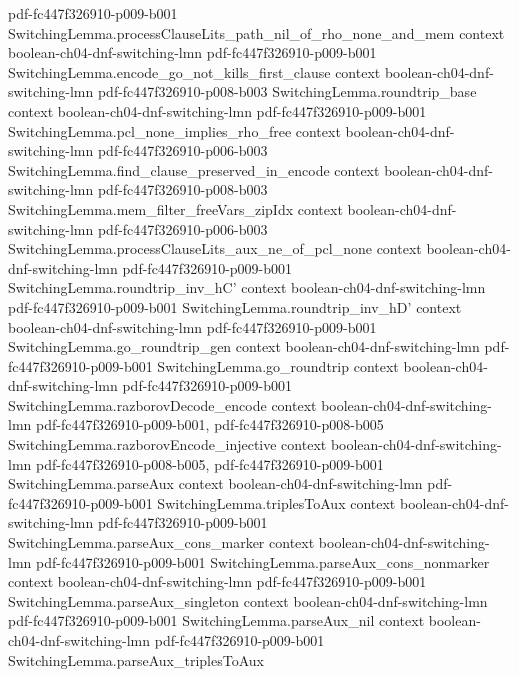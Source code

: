 \begin{theorem}
  {pdf-fc447f326910-p009-b001}
\proofstep
  {SwitchingLemma.processClauseLits_path_nil_of_rho_none_and_mem}
  {context}
  {boolean-ch04-dnf-switching-lmn}
  {pdf-fc447f326910-p009-b001}
\proofstep
  {SwitchingLemma.encode_go_not_kills_first_clause}
  {context}
  {boolean-ch04-dnf-switching-lmn}
  {pdf-fc447f326910-p008-b003}
\proofstep
  {SwitchingLemma.roundtrip_base}
  {context}
  {boolean-ch04-dnf-switching-lmn}
  {pdf-fc447f326910-p009-b001}
\proofstep
  {SwitchingLemma.pcl_none_implies_rho_free}
  {context}
  {boolean-ch04-dnf-switching-lmn}
  {pdf-fc447f326910-p006-b003}
\proofstep
  {SwitchingLemma.find_clause_preserved_in_encode}
  {context}
  {boolean-ch04-dnf-switching-lmn}
  {pdf-fc447f326910-p008-b003}
\proofstep
  {SwitchingLemma.mem_filter_freeVars_zipIdx}
  {context}
  {boolean-ch04-dnf-switching-lmn}
  {pdf-fc447f326910-p006-b003}
\proofstep
  {SwitchingLemma.processClauseLits_aux_ne_of_pcl_none}
  {context}
  {boolean-ch04-dnf-switching-lmn}
  {pdf-fc447f326910-p009-b001}
\proofstep
  {SwitchingLemma.roundtrip_inv_hC'}
  {context}
  {boolean-ch04-dnf-switching-lmn}
  {pdf-fc447f326910-p009-b001}
\proofstep
  {SwitchingLemma.roundtrip_inv_hD'}
  {context}
  {boolean-ch04-dnf-switching-lmn}
  {pdf-fc447f326910-p009-b001}
\proofstep
  {SwitchingLemma.go_roundtrip_gen}
  {context}
  {boolean-ch04-dnf-switching-lmn}
  {pdf-fc447f326910-p009-b001}
\proofstep
  {SwitchingLemma.go_roundtrip}
  {context}
  {boolean-ch04-dnf-switching-lmn}
  {pdf-fc447f326910-p009-b001}
\proofstep
  {SwitchingLemma.razborovDecode_encode}
  {context}
  {boolean-ch04-dnf-switching-lmn}
  {pdf-fc447f326910-p009-b001,
    pdf-fc447f326910-p008-b005}
\proofstep
  {SwitchingLemma.razborovEncode_injective}
  {context}
  {boolean-ch04-dnf-switching-lmn}
  {pdf-fc447f326910-p008-b005,
    pdf-fc447f326910-p009-b001}
\proofstep
  {SwitchingLemma.parseAux}
  {context}
  {boolean-ch04-dnf-switching-lmn}
  {pdf-fc447f326910-p009-b001}
\proofstep
  {SwitchingLemma.triplesToAux}
  {context}
  {boolean-ch04-dnf-switching-lmn}
  {pdf-fc447f326910-p009-b001}
\proofstep
  {SwitchingLemma.parseAux_cons_marker}
  {context}
  {boolean-ch04-dnf-switching-lmn}
  {pdf-fc447f326910-p009-b001}
\proofstep
  {SwitchingLemma.parseAux_cons_nonmarker}
  {context}
  {boolean-ch04-dnf-switching-lmn}
  {pdf-fc447f326910-p009-b001}
\proofstep
  {SwitchingLemma.parseAux_singleton}
  {context}
  {boolean-ch04-dnf-switching-lmn}
  {pdf-fc447f326910-p009-b001}
\proofstep
  {SwitchingLemma.parseAux_nil}
  {context}
  {boolean-ch04-dnf-switching-lmn}
  {pdf-fc447f326910-p009-b001}
\proofstep
  {SwitchingLemma.parseAux_triplesToAux}

\end{theorem}
